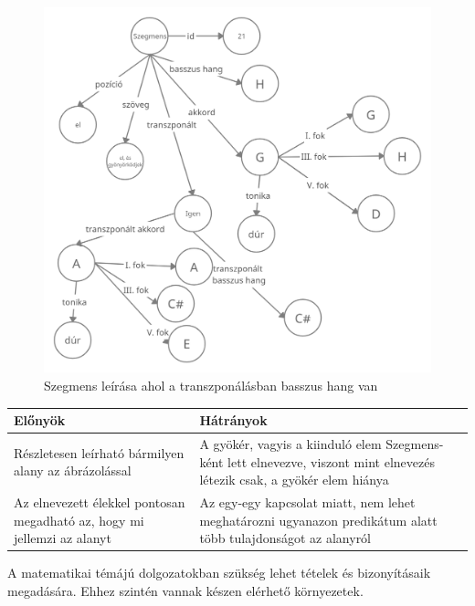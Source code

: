 \newpage
\begin{figure}[h]
	\includegraphics[scale=0.29]{images/rdf_graph_6.png}
	\caption{Szegmens leírása ahol a transzponálásban basszus hang van}
	\label{fig:graph6}
\end{figure}

\begin{center}
	\begin{tabular}{ |p{7cm}|p{7cm}| }
		\hline
		Előnyök & Hátrányok\\
		\hline
		Részletesen leírható bármilyen alany az ábrázolással & A gyökér, vagyis a kiinduló elem Szegmens-ként lett elnevezve, viszont mint elnevezés létezik csak, a gyökér elem hiánya \\ 
		\hline
		Az elnevezett élekkel pontosan megadható az, hogy mi jellemzi az alanyt & Az egy-egy kapcsolat miatt, nem lehet meghatározni ugyanazon predikátum alatt több tulajdonságot az alanyról\\
		\hline
	\end{tabular}
\end{center}


A matematikai témájú dolgozatokban szükség lehet tételek és bizonyításaik megadására.
Ehhez szintén vannak készen elérhető környezetek.

